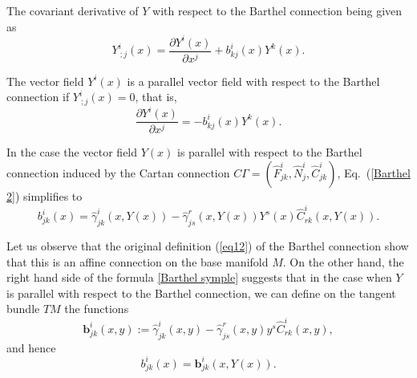 \documentclass[aps,superscriptaddress, showpacs,preprintnumbers, superscriptaddress, nofootinbibt,twocolumn]{revtex4-2}
\begin{document}

The covariant derivative of $Y$  with respect to the Barthel connection being given as  %
\begin{equation}
Y^{i}_{\ ;j}(x)=\frac{\partial Y^{i}(x)}{\partial x^{j}}%
+b_{kj}^{i}( x) Y^{k}(x).
\end{equation}

The vector field $Y^{i}(x)$ is {a parallel vector field}  with respect to the Barthel connection if
$Y^{i}_{\ ;j}(x)=0$,  that is,
\begin{equation}\label{dYi}
\frac{\partial Y^{i}(x)}{\partial x^{j}}=
-b_{kj}^{i}
( x) Y^{k}(x).
\end{equation}

In the case the vector field $Y(x)$ is {parallel} with respect to the Barthel connection induced by the Cartan connection $C\Gamma=(\hat{F}^i_{jk},\hat{N}^i_j,\hat{C}^i_{jk})$, Eq.~(\ref{Barthel 2}) simplifies to
\begin{equation}
\label{Barthel symple}
b_{jk}^{i}(x)=\hat{\gamma} _{jk}^{i}\left( x,Y(x)\right) -\hat{\gamma} _{js}^{r}\left(
x,Y(x)\right) Y^{s}(x)\hat{C}_{rk}^{i}\left( x,Y(x)\right).
\end{equation}

Let us observe that the original definition (\ref{eq12})  of the Barthel connection show that this is an affine connection on the base manifold $M$. On the other hand, the right hand side of the formula \eqref{Barthel symple} suggests that in the case when $Y$ is parallel with respect to the Barthel connection, we can define
on the tangent bundle $TM$ the functions
\begin{equation}
    \mathbf{b}^i_{jk}(x,y):=\hat{\gamma} _{jk}^{i}\left( x,y\right) -\hat{\gamma} _{js}^{r}\left(
x,y\right) y^{s}\hat{C}_{rk}^{i}\left( x,y\right),
\end{equation}
and hence
\begin{equation}
    b^i_{jk}(x)=\mathbf{b}^i_{jk}(x,Y(x)).
\end{equation}
\end{document}
